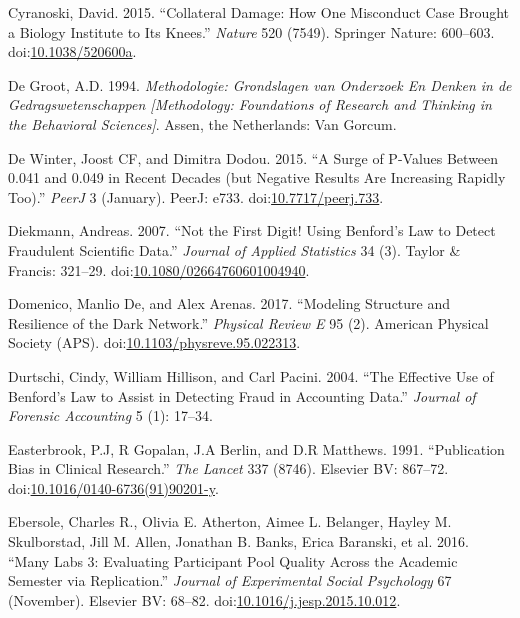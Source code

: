 \documentclass[a5paper]{book}
\begin{document}
\hypertarget{ref-doi:10.1038ux2f520600a}{}
Cyranoski, David. 2015. ``Collateral Damage: How One Misconduct Case
Brought a Biology Institute to Its Knees.'' \emph{Nature} 520 (7549).
Springer Nature: 600--603.
doi:\href{https://doi.org/10.1038/520600a}{10.1038/520600a}.

\hypertarget{ref-isbn:9789023228912}{}
De Groot, A.D. 1994. \emph{Methodologie: Grondslagen van Onderzoek En
Denken in de Gedragswetenschappen {[}Methodology: Foundations of
Research and Thinking in the Behavioral Sciences{]}}. Assen, the
Netherlands: Van Gorcum.

\hypertarget{ref-doi:10.7717ux2fpeerj.733}{}
De Winter, Joost CF, and Dimitra Dodou. 2015. ``A Surge of P-Values
Between 0.041 and 0.049 in Recent Decades (but Negative Results Are
Increasing Rapidly Too).'' \emph{PeerJ} 3 (January). PeerJ: e733.
doi:\href{https://doi.org/10.7717/peerj.733}{10.7717/peerj.733}.

\hypertarget{ref-doi:10.1080ux2f02664760601004940}{}
Diekmann, Andreas. 2007. ``Not the First Digit! Using Benford's Law to
Detect Fraudulent Scientific Data.'' \emph{Journal of Applied
Statistics} 34 (3). Taylor \& Francis: 321--29.
doi:\href{https://doi.org/10.1080/02664760601004940}{10.1080/02664760601004940}.

\hypertarget{ref-doi:10.1103ux2fphysreve.95.022313}{}
Domenico, Manlio De, and Alex Arenas. 2017. ``Modeling Structure and
Resilience of the Dark Network.'' \emph{Physical Review E} 95 (2).
American Physical Society (APS).
doi:\href{https://doi.org/10.1103/physreve.95.022313}{10.1103/physreve.95.022313}.

\hypertarget{ref-durtschi2004effective}{}
Durtschi, Cindy, William Hillison, and Carl Pacini. 2004. ``The
Effective Use of Benford's Law to Assist in Detecting Fraud in
Accounting Data.'' \emph{Journal of Forensic Accounting} 5 (1): 17--34.

\hypertarget{ref-doi:10.1016ux2f0140-6736_91_90201-y}{}
Easterbrook, P.J, R Gopalan, J.A Berlin, and D.R Matthews. 1991.
``Publication Bias in Clinical Research.'' \emph{The Lancet} 337 (8746).
Elsevier BV: 867--72.
doi:\href{https://doi.org/10.1016/0140-6736(91)90201-y}{10.1016/0140-6736(91)90201-y}.

\hypertarget{ref-doi:10.1016ux2fj.jesp.2015.10.012}{}
Ebersole, Charles R., Olivia E. Atherton, Aimee L. Belanger, Hayley M.
Skulborstad, Jill M. Allen, Jonathan B. Banks, Erica Baranski, et al.
2016. ``Many Labs 3: Evaluating Participant Pool Quality Across the
Academic Semester via Replication.'' \emph{Journal of Experimental
Social Psychology} 67 (November). Elsevier BV: 68--82.
doi:\href{https://doi.org/10.1016/j.jesp.2015.10.012}{10.1016/j.jesp.2015.10.012}.
\end{document}
